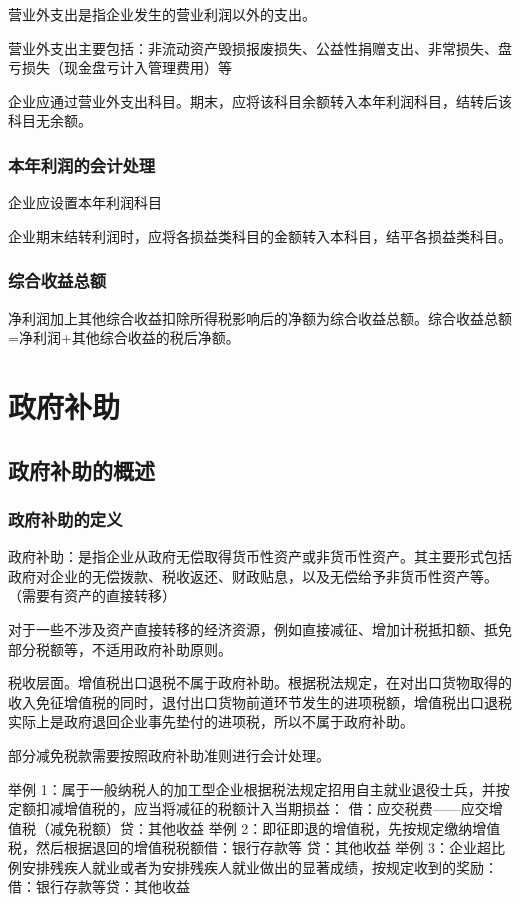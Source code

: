 \documentclass[UTF8,12pt]{ctexart}
\numberwithin{equation}{section} %
\numberwithin{figure}{section}
\numberwithin{table}{section}
\begin{document}
	营业外支出是指企业发生的营业利润以外的支出。
	
	营业外支出主要包括：非流动资产毁损报废损失、公益性捐赠支出、非常损失、盘亏损失（现金盘亏计入管理费用）等
	
	企业应通过营业外支出科目。期末，应将该科目余额转入本年利润科目，结转后该科目无余额。
	\subsubsection{本年利润的会计处理}
	企业应设置本年利润科目
	
	企业期末结转利润时，应将各损益类科目的金额转入本科目，结平各损益类科目。
	\subsubsection{综合收益总额}
	净利润加上其他综合收益扣除所得税影响后的净额为综合收益总额。综合收益总额=净利润+其他综合收益的税后净额。
	
	
	\newpage
	\section{政府补助}
	\subsection{政府补助的概述}
	\subsubsection{政府补助的定义}
	政府补助：是指企业从政府无偿取得货币性资产或非货币性资产。其主要形式包括政府对企业的无偿拨款、税收返还、财政贴息，以及无偿给予非货币性资产等。（需要有资产的直接转移）
	
	对于一些不涉及资产直接转移的经济资源，例如直接减征、增加计税抵扣额、抵免部分税额等，不适用政府补助原则。
	
	税收层面。增值税出口退税不属于政府补助。根据税法规定，在对出口货物取得的收入免征增值税的同时，退付出口货物前道环节发生的进项税额，增值税出口退税实际上是政府退回企业事先垫付的进项税，所以不属于政府补助。
	
	部分减免税款需要按照政府补助准则进行会计处理。
	
	举例 1：属于一般纳税人的加工型企业根据税法规定招用自主就业退役士兵，并按定额扣减增值税的，应当将减征的税额计入当期损益：
	借：应交税费——应交增值税（减免税额）贷：其他收益
	举例 2：即征即退的增值税，先按规定缴纳增值税，然后根据退回的增值税税额借：银行存款等
	贷：其他收益
	举例 3：企业超比例安排残疾人就业或者为安排残疾人就业做出的显著成绩，按规定收到的奖励：
	借：银行存款等贷：其他收益
	
\end{document}
